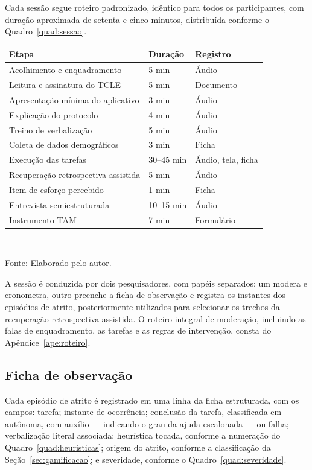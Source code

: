 Cada sessão segue roteiro padronizado, idêntico para todos os participantes, com
duração aproximada de setenta e cinco minutos, distribuída conforme o
Quadro~\ref{quad:sessao}.

\begin{quadro}[htb]
\centering
\caption{Estrutura da sessão de avaliação}
\label{quad:sessao}
\begin{tabular}{p{6.4cm} p{2.0cm} p{4.4cm}}
\toprule
\textbf{Etapa} & \textbf{Duração} & \textbf{Registro} \\
\midrule
Acolhimento e enquadramento & 5 min & Áudio \\
Leitura e assinatura do TCLE & 5 min & Documento \\
Apresentação mínima do aplicativo & 3 min & Áudio \\
Explicação do protocolo & 4 min & Áudio \\
Treino de verbalização & 5 min & Áudio \\
Coleta de dados demográficos & 3 min & Ficha \\
Execução das tarefas & 30--45 min & Áudio, tela, ficha \\
Recuperação retrospectiva assistida & 5 min & Áudio \\
Item de esforço percebido & 1 min & Ficha \\
Entrevista semiestruturada & 10--15 min & Áudio \\
Instrumento TAM & 7 min & Formulário \\
\bottomrule
\end{tabular}
\\[4pt]
\begin{flushleft}
Fonte: Elaborado pelo autor.
\end{flushleft}
\end{quadro}

A sessão é conduzida por dois pesquisadores, com papéis separados: um modera e
cronometra, outro preenche a ficha de observação e registra os instantes dos
episódios de atrito, posteriormente utilizados para selecionar os trechos da
recuperação retrospectiva assistida. O roteiro integral de moderação, incluindo as
falas de enquadramento, as tarefas e as regras de intervenção, consta do
Apêndice~\ref{ape:roteiro}.

\subsection{Ficha de observação}

Cada episódio de atrito é registrado em uma linha da ficha estruturada, com os
campos: tarefa; instante de ocorrência; conclusão da tarefa, classificada em
autônoma, com auxílio --- indicando o grau da ajuda escalonada --- ou falha;
verbalização literal associada; heurística tocada, conforme a numeração do
Quadro~\ref{quad:heuristicas}; origem do atrito, conforme a classificação da
Seção~\ref{sec:gamificacao}; e severidade, conforme o
Quadro~\ref{quad:severidade}.

